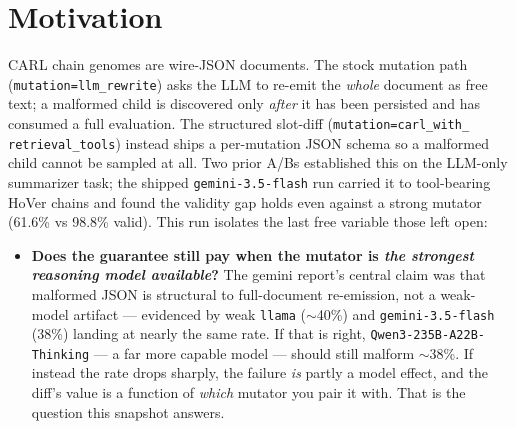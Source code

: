 \documentclass[11pt]{article}
\begin{document}
\section{Motivation}
CARL chain genomes are wire-JSON documents. The stock mutation path
(\texttt{mutation=llm\_rewrite}) asks the LLM to re-emit the \emph{whole} document as free
text; a malformed child is discovered only \emph{after} it has been persisted and has
consumed a full evaluation. The structured slot-diff (\texttt{mutation=carl\_with\_%
retrieval\_tools}) instead ships a per-mutation JSON schema so a malformed child cannot be
sampled at all. Two prior A/Bs established this on the LLM-only summarizer task; the shipped
\texttt{gemini-3.5-flash} run carried it to tool-bearing HoVer chains and found the validity
gap holds even against a strong mutator (61.6\% vs 98.8\% valid). This run isolates the last
free variable those left open:
\begin{itemize}
  \item \textbf{Does the guarantee still pay when the mutator is \emph{the strongest reasoning
  model available}?} The gemini report's central claim was that malformed JSON is structural
  to full-document re-emission, not a weak-model artifact --- evidenced by weak \texttt{llama}
  ($\sim$40\%) and \texttt{gemini-3.5-flash} (38\%) landing at nearly the same rate. If that
  is right, \texttt{Qwen3-235B-A22B-Thinking} --- a far more capable model --- should still
  malform $\sim$38\%. If instead the rate drops sharply, the failure \emph{is} partly a model
  effect, and the diff's value is a function of \emph{which} mutator you pair it with. That is
  the question this snapshot answers.
\end{itemize}
\end{document}
